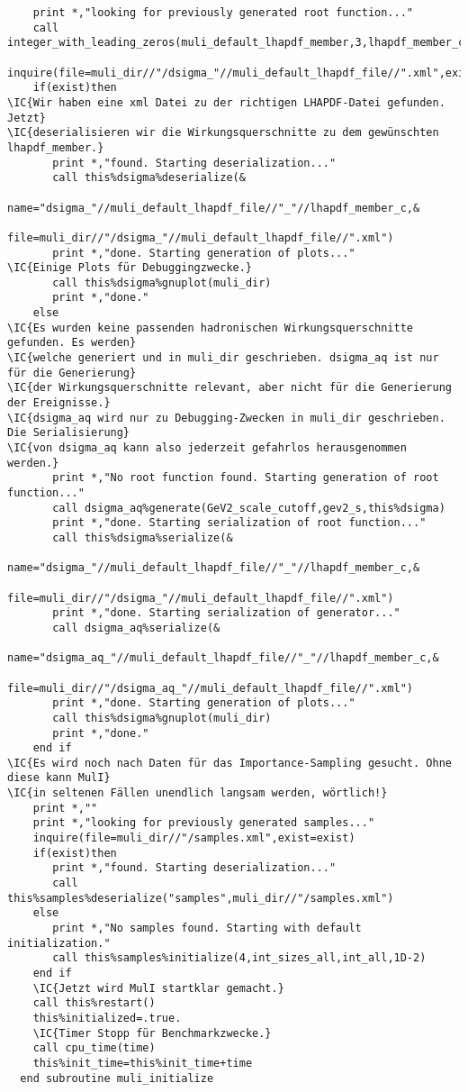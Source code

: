 \begin{Verbatim}
    print *,"looking for previously generated root function..."
    call integer_with_leading_zeros(muli_default_lhapdf_member,3,lhapdf_member_c)
    inquire(file=muli_dir//"/dsigma_"//muli_default_lhapdf_file//".xml",exist=exist)
    if(exist)then
\IC{Wir haben eine xml Datei zu der richtigen LHAPDF-Datei gefunden. Jetzt}
\IC{deserialisieren wir die Wirkungsquerschnitte zu dem gewünschten lhapdf_member.}
       print *,"found. Starting deserialization..."
       call this%dsigma%deserialize(&
            name="dsigma_"//muli_default_lhapdf_file//"_"//lhapdf_member_c,&
            file=muli_dir//"/dsigma_"//muli_default_lhapdf_file//".xml")
       print *,"done. Starting generation of plots..."
\IC{Einige Plots für Debuggingzwecke.}
       call this%dsigma%gnuplot(muli_dir)
       print *,"done."
    else
\IC{Es wurden keine passenden hadronischen Wirkungsquerschnitte gefunden. Es werden}
\IC{welche generiert und in muli_dir geschrieben. dsigma_aq ist nur für die Generierung}
\IC{der Wirkungsquerschnitte relevant, aber nicht für die Generierung der Ereignisse.}
\IC{dsigma_aq wird nur zu Debugging-Zwecken in muli_dir geschrieben. Die Serialisierung}
\IC{von dsigma_aq kann also jederzeit gefahrlos herausgenommen werden.}
       print *,"No root function found. Starting generation of root function..."
       call dsigma_aq%generate(GeV2_scale_cutoff,gev2_s,this%dsigma)
       print *,"done. Starting serialization of root function..."
       call this%dsigma%serialize(& 
            name="dsigma_"//muli_default_lhapdf_file//"_"//lhapdf_member_c,&
            file=muli_dir//"/dsigma_"//muli_default_lhapdf_file//".xml")
       print *,"done. Starting serialization of generator..."
       call dsigma_aq%serialize(&
            name="dsigma_aq_"//muli_default_lhapdf_file//"_"//lhapdf_member_c,&
            file=muli_dir//"/dsigma_aq_"//muli_default_lhapdf_file//".xml")
       print *,"done. Starting generation of plots..."
       call this%dsigma%gnuplot(muli_dir)
       print *,"done."
    end if
\IC{Es wird noch nach Daten für das Importance-Sampling gesucht. Ohne diese kann MulI}
\IC{in seltenen Fällen unendlich langsam werden, wörtlich!}
    print *,""
    print *,"looking for previously generated samples..."
    inquire(file=muli_dir//"/samples.xml",exist=exist)
    if(exist)then
       print *,"found. Starting deserialization..."
       call this%samples%deserialize("samples",muli_dir//"/samples.xml")
    else
       print *,"No samples found. Starting with default initialization."
       call this%samples%initialize(4,int_sizes_all,int_all,1D-2)
    end if
    \IC{Jetzt wird MulI startklar gemacht.}
    call this%restart()
    this%initialized=.true.
    \IC{Timer Stopp für Benchmarkzwecke.}
    call cpu_time(time)
    this%init_time=this%init_time+time
  end subroutine muli_initialize
\end{Verbatim}

